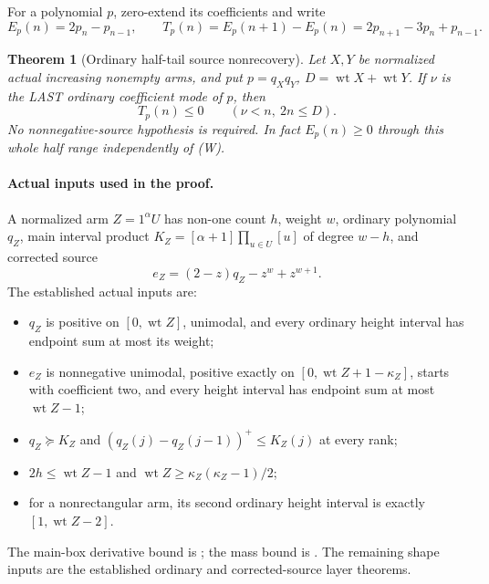 \documentclass[11pt]{article}
\newtheorem{theorem}[proposition]{Theorem}
\begin{document}
\par\medskip

For a polynomial $p$, zero-extend its coefficients and write
\[
 E_p(n)=2p_n-p_{n-1},\qquad
 T_p(n)=E_p(n+1)-E_p(n)=2p_{n+1}-3p_n+p_{n-1}.
\]
\begin{theorem}[Ordinary half-tail source nonrecovery]\label{thm:actual-half-tail}
Let $X,Y$ be normalized actual increasing nonempty arms, and put
$p=q_Xq_Y$, $D=\operatorname{wt}X+\operatorname{wt}Y$.
If $\nu$ is the LAST ordinary coefficient mode of $p$, then
\[
                        T_p(n)\le0\qquad(\nu<n,\ 2n\le D). \tag{W}
\]
No nonnegative-source hypothesis is required. In fact $E_p(n)\ge0$
through this whole half range independently of (W).
\end{theorem}

\paragraph{Actual inputs used in the proof.}
A normalized arm $Z=1^\alpha U$ has non-one count $h$, weight $w$,
ordinary polynomial $q_Z$, main interval product
$K_Z=[\alpha+1]\prod_{u\in U}[u]$ of degree $w-h$, and corrected source
\[
 e_Z=(2-z)q_Z-z^w+z^{w+1}.
\]
The established actual inputs are:
\begin{itemize}
\item $q_Z$ is positive on $[0,\operatorname{wt}Z]$, unimodal,
and every ordinary height interval has endpoint sum at most its weight;
\item $e_Z$ is nonnegative unimodal, positive exactly on
$[0,\operatorname{wt}Z+1-\kappa_Z]$, starts with coefficient two,
and every height interval has endpoint sum at most $\operatorname{wt}Z-1$;
\item $q_Z\succeq K_Z$ and
$(q_Z(j)-q_Z(j-1))^+\le K_Z(j)$ at every rank;
\item $2h\le\operatorname{wt}Z-1$ and
$\operatorname{wt}Z\ge\kappa_Z(\kappa_Z-1)/2$;
\item for a nonrectangular arm, its second ordinary height interval is
exactly $[1,\operatorname{wt}Z-2]$.
\end{itemize}
The main-box derivative bound is
{\normalfont{}}; the mass bound is
{\normalfont{}}. The remaining shape inputs are the
established ordinary and corrected-source layer theorems.
\end{document}

